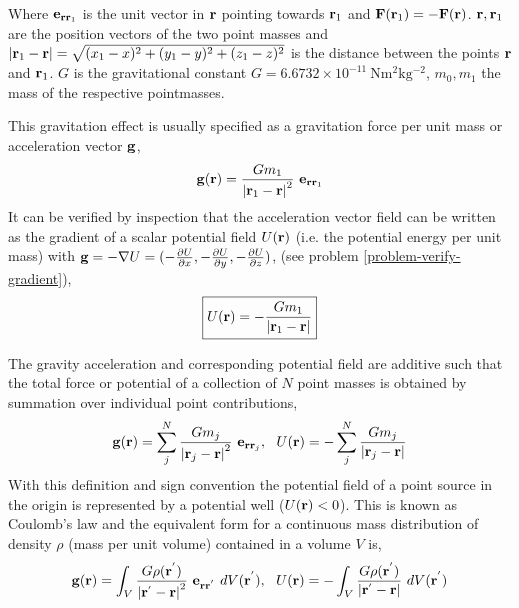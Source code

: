 Where ${\bf e}_{{\bf rr}_1}$ is the unit vector in 
${\bf r}$ pointing towards ${\bf r}_1$
and ${\bf F}({\bf r}_1) = - {\bf F}({\bf r})$.
${\bf r}, {\bf r}_1$ 
are the position vectors of the two point masses
and 
$\left | {\bf r}_1 - {\bf r} \right | =
\sqrt{(x_1-x)^2 + (y_1-y)^2 + (z_1-z)^2}$
is the distance between the points ${\bf r}$ and ${\bf r}_1$.
$G$ is the gravitational constant 
$G = 6.6732 \times 10^{-11} ~\mathrm{Nm^{2}kg^{-2}}$,
$m_0, m_1$ the mass of the respective pointmasses.




This gravitation effect is usually specified as a gravitation force per 
unit mass or acceleration vector ${\bf g}$,
\begin{equation}
{\bf g}({\bf r}) =
   \frac{G m_1}{\left | {\bf r}_1 - {\bf r} \right | ^2} ~ 
                {\bf e}_{{\bf r r}_1} 
\label{grav_accel}
\end{equation}
It can be verified by inspection that the acceleration vector field 
can be written as the 
gradient of a scalar potential field $U({\bf r})$ (i.e. the potential
energy per unit mass) with
${\bf g} = - \nabla U = 
(- \frac{\partial U}{\partial x}, 
 - \frac{\partial U}{\partial y}, 
 - \frac{\partial U}{\partial z})$,
(see problem \ref{problem-verify-gradient}),
\begin{equation}
\boxed{U({\bf r}) = - \frac{G m_1}{\left | {\bf r}_1 - {\bf r} \right |} }
\label{grav_potential}
\end{equation}

The gravity acceleration and corresponding potential field are additive 
such that the total force or potential of a 
collection of $N$ point masses is obtained by summation over individual
point contributions,
\begin{equation}
{\bf g} ({\bf r}) = 
        \sum_j^N \frac{G m_j}{\left | {\bf r}_j - {\bf r} \right | ^2} ~ 
         {\bf e}_{{\bf r r}_j}
,\ \ 
U({\bf r}) = 
        - \sum_j^N \frac{G m_j}{\left | {\bf r}_j - {\bf r} \right |}
\end{equation}
With this definition and sign convention 
the potential field of
a point source in the origin is represented by a
potential well ($U({\bf r}) < 0$).
This is known as Coulomb's law and the equivalent form for a continuous
mass distribution of density $\rho$ (mass per unit volume) contained in
a volume $V$ is,
\begin{equation}
{\bf g}({\bf r}) = 
        \int_V \frac{G \rho({\bf r}^{'})}
                     {\left | {\bf r}^{'} - {\bf r} \right | ^2} ~ 
               {\bf e}_{{\bf r r}^{'}} ~ dV({\bf r}^{'})
,\ \ 
U({\bf r}) = 
        - \int_V \frac{G \rho({\bf r}^{'})}
                     {\left | {\bf r}^{'} - {\bf r} \right |} ~ 
               dV({\bf r}^{'})
\label{Coulomb-integrals}
\end{equation}

